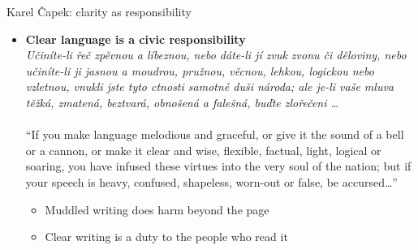 \documentclass[aspectratio=169]{beamer}
\begin{document}
\begin{frame}{Karel \v{C}apek: clarity as responsibility}
  \begin{itemize}
    \item \textbf{Clear language is a civic responsibility}\\[0.6em]

      \emph{Učiníte-li řeč zpěvnou a líbeznou, nebo dáte-li jí zvuk zvonu či
      děloviny, nebo učiníte-li ji jasnou a moudrou, pružnou, věcnou, lehkou,
      logickou nebo vzletnou, vnukli jste tyto ctnosti samotné duši národa;
      ale je-li vaše mluva těžká, zmatená, beztvará, obnošená a falešná,
      buďte zlořečeni …}\\
    \citep[p~177]{capek:marsyas}
    \\
      ``If you make language melodious and graceful, or give it the sound of a bell or a cannon, or make it clear and wise, flexible, factual, light, logical or soaring, you have infused these virtues into the very soul of the nation; but if your speech is heavy, confused, shapeless, worn-out or false, be accursed\ldots''

      \vspace{0.8em}
      \begin{itemize}
        \item Muddled writing does harm beyond the page
        \item Clear writing is a duty to the people who read it
      \end{itemize}
  \end{itemize}
\end{frame}
\end{document}

